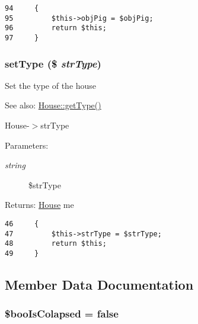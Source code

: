 \begin{Code}\begin{verbatim}94     {
95         $this->objPig = $objPig;
96         return $this;
97     }
\end{verbatim}
\end{Code}


\hypertarget{class_house_48d409343c54e747174ffaf5911b2cd9}{
\subsubsection[{setType}]{\setlength{\rightskip}{0pt plus 5cm}setType (\$ {\em strType})}}
\label{class_house_48d409343c54e747174ffaf5911b2cd9}


Set the type of the house

\begin{Desc}
\item[See also:]\hyperlink{class_house_830b5c75df72b32396701bc563fbe3c7}{House::getType()} 

House-$>$strType \end{Desc}
\begin{Desc}
\item[Parameters:]
\begin{description}
\item[{\em string}]\$strType \end{description}
\end{Desc}
\begin{Desc}
\item[Returns:]\hyperlink{class_house}{House} me \end{Desc}


\begin{Code}\begin{verbatim}46     {
47         $this->strType = $strType;
48         return $this;
49     }
\end{verbatim}
\end{Code}




\subsection{Member Data Documentation}
\hypertarget{class_house_2eaf201bec0ce5594be8a5eb8e71b5b9}{
\subsubsection[{\$booIsColapsed}]{\setlength{\rightskip}{0pt plus 5cm}\$booIsColapsed = false}}
\label{class_house_2eaf201bec0ce5594be8a5eb8e71b5b9}


